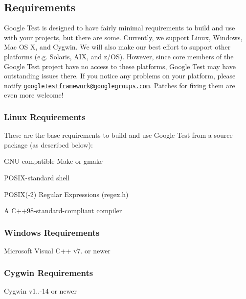 \subsection*{Requirements}

Google Test is designed to have fairly minimal requirements to build and use with your projects, but there are some. Currently, we support Linux, Windows, Mac OS X, and Cygwin. We will also make our best effort to support other platforms (e.\+g. Solaris, A\+IX, and z/\+OS). However, since core members of the Google Test project have no access to these platforms, Google Test may have outstanding issues there. If you notice any problems on your platform, please notify \href{mailto:googletestframework@googlegroups.com}{\tt googletestframework@googlegroups.\+com}. Patches for fixing them are even more welcome!

\subsubsection*{Linux Requirements}

These are the base requirements to build and use Google Test from a source package (as described below)\+:


\begin{DoxyItemize}
\item G\+N\+U-\/compatible Make or gmake
\item P\+O\+S\+I\+X-\/standard shell
\item P\+O\+S\+IX(-\/2) Regular Expressions (regex.\+h)
\item A C++98-\/standard-\/compliant compiler
\end{DoxyItemize}

\subsubsection*{Windows Requirements}


\begin{DoxyItemize}
\item Microsoft Visual C++ v7. or newer
\end{DoxyItemize}

\subsubsection*{Cygwin Requirements}


\begin{DoxyItemize}
\item Cygwin v1..-\/14 or newer
\end{DoxyItemize}

